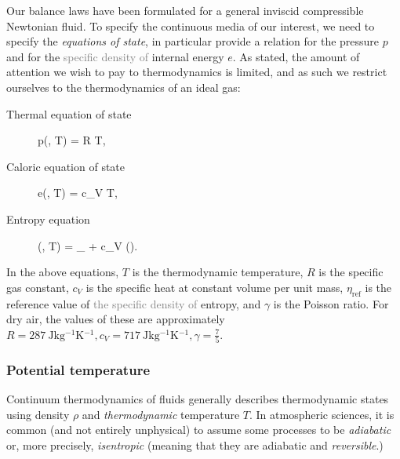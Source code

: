 \documentclass[../main.tex]{subfiles}
\begin{document}
Our balance laws  have been formulated for a general inviscid compressible Newtonian fluid. To specify the continuous media of our interest, we need to specify the \emph{equations of state}, in particular provide a relation for the pressure $p$ and for the \textcolor{gray}{specific density of} internal energy $e$. As stated, the amount of attention we wish to pay to thermodynamics is limited, and as such we restrict ourselves to the thermodynamics of an ideal gas:

\begin{description}
	\item[Thermal equation of state]\mbox{}
	\begin{equations}[single,!,numberline=all]
	\label{eq:THERMAL}
	p\left(\rho, T\right) = R \rho T,
	\end{equations}
	\item[Caloric equation of state]\mbox{}
	\begin{equations}[single,!,numberline=all]
	\label{eq:CALORIC}
	e\left(\rho, T\right) = c_V T,
	\end{equations}
	\item[Entropy equation]\mbox{}
	\begin{equations}[single,!,numberline=all]
	\label{eq:ENTROPY}
	\eta\left(\rho, T\right) = \eta_{} + c_V \log\left(\right).
	\end{equations}
\end{description}

In the above equations, $T$ is the thermodynamic temperature, $R$ is the specific gas constant, $c_V$ is the specific heat at constant volume per unit mass, $\eta_{\text{ref}}$ is the reference value of \textcolor{gray}{the specific density of} entropy, and $\gamma$ is the Poisson ratio. For dry air, the values of these are approximately $R = \qty{287}{\joule \kilogram^{-1} \kelvin^{-1}}, c_V = \qty{717}{\joule \kilogram^{-1} \kelvin^{-1}}, \gamma = \frac{7}{5}$.

\subsubsection{Potential temperature}
\label{sec:POTENTIAL_TEMP}

Continuum thermodynamics of fluids generally describes thermodynamic states using density $\rho$ and \emph{thermodynamic} temperature $T$. In atmospheric sciences, it is common (and not entirely unphysical) to assume some processes to be \emph{adiabatic} or, more precisely, \emph{isentropic} (meaning that they are adiabatic and \emph{reversible}.) 
\end{document}
